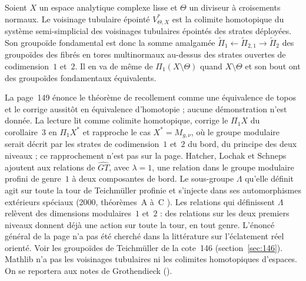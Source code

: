 \begin{encadre}
\begin{theoreme*}\nonverifie
Soient $X$ un espace analytique complexe lisse et $\Theta$ un diviseur à croisements normaux. Le voisinage tubulaire épointé $V^*_{\Theta,X}$ est la colimite homotopique du système semi-simplicial des voisinages tubulaires épointés des strates déployées. Son groupoïde fondamental est donc la somme amalgamée $\tilde\Pi_1 \leftarrow \tilde\Pi_{2,1} \to \tilde\Pi_2$ des groupoïdes des fibrés en tores multinormaux au-dessus des strates ouvertes de codimension~$1$ et~$2$. Il en va de même de $\Pi_1(X \setminus \Theta)$ quand $X \setminus \Theta$ et son bout ont des groupoïdes fondamentaux équivalents.
\end{theoreme*}
\end{encadre}
{\small La page~149 énonce le théorème de recollement comme une équivalence de topos et le corrige aussitôt en équivalence d'homotopie ; aucune démonstration n'est donnée. La lecture lit  comme colimite homotopique, corrige le $\Pi_1 X$ du corollaire~3 en $\Pi_1 X^*$ et rapproche le cas $X^* = M_{g,\nu}$, où le groupe modulaire serait décrit par les strates de codimension~$1$ et~$2$ du bord, du principe des deux niveaux ; ce rapprochement n'est pas sur la page. Hatcher, Lochak et Schneps ajoutent aux relations de $\widehat{GT}$, avec $\lambda = 1$, une relation dans le groupe modulaire profini de genre~$1$ à deux composantes de bord. Le sous-groupe $\Lambda$ qu'elle définit agit sur toute la tour de Teichmüller profinie et s'injecte dans ses automorphismes extérieurs spéciaux (2000, théorèmes~A à~C \cite{hatcherlochakschneps2000}). Les relations qui définissent $\Lambda$ relèvent des dimensions modulaires~$1$ et~$2$ : des relations sur les deux premiers niveaux donnent déjà une action sur toute la tour, en tout genre. L'énoncé général de la page n'a pas été cherché dans la littérature sur l'éclatement réel orienté. Voir les groupoïdes de Teichmüller de la cote~146 (section~\ref{sec:146}). Mathlib n'a pas les voisinages tubulaires ni les colimites homotopiques d'espaces. On se reportera aux notes de Grothendieck ().\par}

